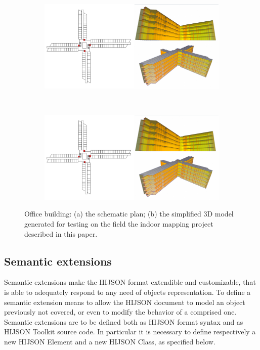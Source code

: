 \begin{figure}[!h]
 \centering
 \begin{subfigure}[b]{0.48\linewidth}
 \includegraphics[width=\textwidth]{images/sogei-a} 
 \caption{}
 \label{fig:sogei-a}
 \end{subfigure}
 ~
 \begin{subfigure}[b]{0.48\linewidth}
 \includegraphics[width=\textwidth]{images/sogei-b}
 \caption{}
 \label{fig:sogei-b}
 \end{subfigure}
 
 \caption{Office building: 
 (a) the schematic plan; 
 (b) the simplified 3D model generated for testing on the field 
 the indoor mapping project described in this paper.
 }
 \label{fig:sogei}
\end{figure}

\subsection{Semantic extensions}\label{semantic-extensions}

Semantic extensions make the HIJSON format extendible and customizable, that
is able to adequately respond to any need of objects representation. To define a
semantic extension means to allow the HIJSON document to model an object
previously not covered, or even to modify the behavior of a comprised one.
Semantic extensions are to be defined both as HIJSON format syntax and as
HIJSON Toolkit source code. In particular it is necessary to define respectively
a new HIJSON Element and a new HIJSON Class, as specified below.

